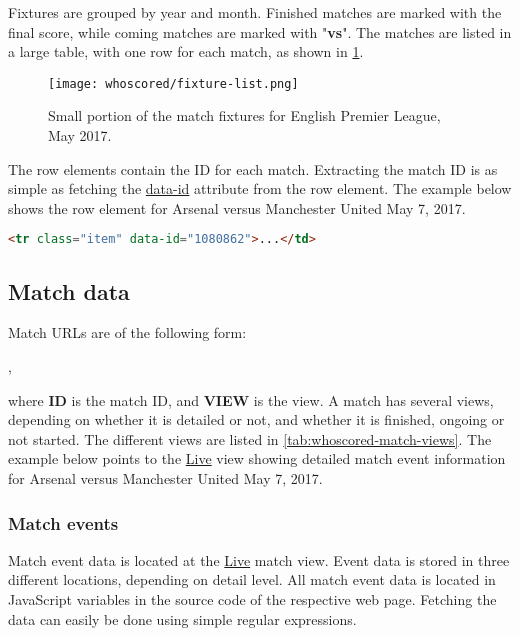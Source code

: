 Fixtures are grouped by year and month. Finished matches are marked with the final score, while coming matches are marked with "\textbf{vs}". The matches are listed in a large table, with one row for each match, as shown in \cref{fig:whoscored-fixture-list}.

\begin{figure}
    \centering
    \texttt{[image: whoscored/fixture-list.png]}
    \caption{Small portion of the match fixtures for English Premier League, May 2017.}
    \label{fig:whoscored-fixture-list}
\end{figure}

The row elements contain the ID for each match. Extracting the match ID is as simple as fetching the \url{data-id} attribute from the row element. The example below shows the row element for Arsenal versus Manchester United May 7, 2017.
\begin{lstlisting}[language=HTML,caption={Hypertext to Arsenal versus Manchester United May 7, 2017.}]
<tr class="item" data-id="1080862">...</td>
\end{lstlisting}


\subsection{Match data}

Match URLs are of the following form:

,

where \textbf{ID} is the match ID, and \textbf{VIEW} is the view. A match has several views, depending on whether it is detailed or not, and whether it is finished, ongoing or not started. The different views are listed in \cref{tab:whoscored-match-views}. The example below points to the \url{Live} view showing detailed match event information for Arsenal versus Manchester United May 7, 2017.


\subsubsection{Match events}

Match event data is located at the \url{Live} match view. Event data is stored in three different locations, depending on detail level. All match event data is located in JavaScript variables in the source code of the respective web page. Fetching the data can easily be done using simple regular expressions.

